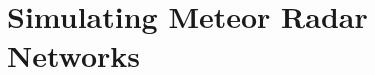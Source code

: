\section[Monte Carlo Simulation to Estimate Meteor Radar Performance]{Simulating Meteor Radar Networks}






















